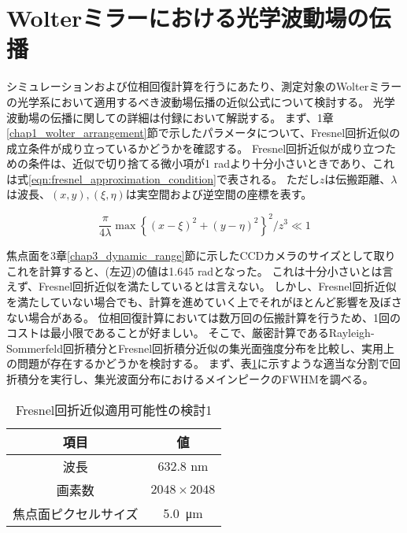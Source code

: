 \section{Wolterミラーにおける光学波動場の伝播}
\label{chap2_wolter_diffraction_apporoximation}

シミュレーションおよび位相回復計算を行うにあたり、測定対象のWolterミラーの光学系において適用するべき波動場伝播の近似公式について検討する。
光学波動場の伝播に関しての詳細は付録において解説する。
まず、1章\ref{chap1_wolter_arrangement}節で示したパラメータについて、Fresnel回折近似の成立条件が成り立っているかどうかを確認する。
Fresnel回折近似が成り立つための条件は、近似で切り捨てる微小項が1 radより十分小さいときであり、これは式\ref{eqn:fresnel_approximation_condition}で表される。
ただし$z$は伝搬距離、$\lambda$は波長、$(x, y), (\xi, \eta)$は実空間および逆空間の座標を表す。

\begin{equation}
\label{eqn:fresnel_approximation_condition}
    \frac{\pi}{4\lambda} \max \left\{ (x-\xi)^2 + (y-\eta)^2 \right\}^2 / z^3 \ll 1
\end{equation}

焦点面を3章\ref{chap3_dynamic_range}節に示したCCDカメラのサイズとして取りこれを計算すると、(左辺)の値は1.645 radとなった。
これは十分小さいとは言えず、Fresnel回折近似を満たしているとは言えない。
しかし、Fresnel回折近似を満たしていない場合でも、計算を進めていく上でそれがほとんど影響を及ぼさない場合がある。
位相回復計算においては数万回の伝搬計算を行うため、1回のコストは最小限であることが好ましい。
そこで、厳密計算であるRayleigh-Sommerfeld回折積分とFresnel回折積分近似の集光面強度分布を比較し、実用上の問題が存在するかどうかを検討する。
まず、表\ref{tb:check_approximation_validity_1}に示すような適当な分割で回折積分を実行し、集光波面分布におけるメインピークのFWHMを調べる。

\begin{table}[!ht]
\begin{center}
  \begin{tabular}{|c|c|} \hline
    項目 & 値 \\ \hline
    波長 & 632.8 nm \\
    画素数 & $2048 \times 2048$ \\
    焦点面ピクセルサイズ & \SI{5.0}{\micro \metre} \\ \hline
  \end{tabular}
  \caption{Fresnel回折近似適用可能性の検討1}
  \label{tb:check_approximation_validity_1}
\end{center}
\end{table}

